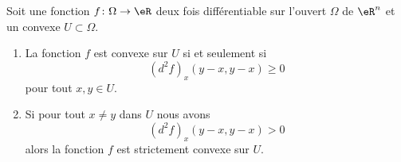 \begin{proposition}      \label{PROPooBMIRooFkQSAb}
	Soit une fonction \( f\colon \Omega\to \eR\) deux fois différentiable sur l'ouvert \( \Omega\) de \( \eR^n\) et un convexe \( U\subset \Omega\).
	\begin{enumerate}
		\item       \label{ITEMooZQCAooIFjHOn}
		      La fonction \( f\) est convexe sur \( U\) si et seulement si
		      \begin{equation}        \label{EQooIBDCooJYdiBb}
			      (d^2f)_x(y-x,y-x)\geq 0
		      \end{equation}
		      pour tout \( x,y\in U\).
		\item       \label{ITEMooHAGQooYZyhQk}
		      Si pour tout \( x\neq y\) dans \( U\) nous avons
		      \begin{equation}
			      (d^2f)_x(y-x,y-x)>0
		      \end{equation}
		      alors la fonction \( f\) est strictement convexe sur \( U\).
	\end{enumerate}
\end{proposition}


